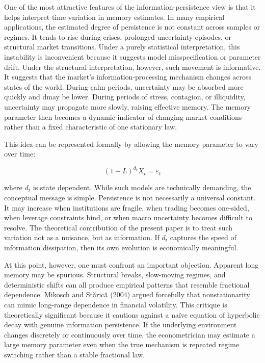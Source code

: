 \documentclass[12pt]{article}
\begin{document}
One of the most attractive features of the information-persistence view is that it helps interpret time variation in memory estimates. In many empirical applications, the estimated degree of persistence is not constant across samples or regimes. It tends to rise during crises, prolonged uncertainty episodes, or structural market transitions. Under a purely statistical interpretation, this instability is inconvenient because it suggests model misspecification or parameter drift. Under the structural interpretation, however, such movement is informative. It suggests that the market's information-processing mechanism changes across states of the world. During calm periods, uncertainty may be absorbed more quickly and dmay be lower. During periods of stress, contagion, or illiquidity, uncertainty may propagate more slowly, raising effective memory. The memory parameter then becomes a dynamic indicator of changing market conditions rather than a fixed characteristic of one stationary law.

This idea can be represented formally by allowing the memory parameter to vary over time:

\[(1-L)^{d_t} X_t = \varepsilon_t\]

where $d_t$ is state dependent. While such models are technically demanding, the conceptual message is simple. Persistence is not necessarily a universal constant. It may increase when institutions are fragile, when trading becomes one-sided, when leverage constraints bind, or when macro uncertainty becomes difficult to resolve. The theoretical contribution of the present paper is to treat such variation not as a nuisance, but as information. If $d_t$ captures the speed of information dissipation, then its own evolution is economically meaningful.

At this point, however, one must confront an important objection. Apparent long memory may be spurious. Structural breaks, slow-moving regimes, and deterministic shifts can all produce empirical patterns that resemble fractional dependence. Mikosch and St\u{a}ric\u{a} (2004) argued forcefully that nonstationarity can mimic long-range dependence in financial volatility. This critique is theoretically significant because it cautions against a na\"{i}ve equation of hyperbolic decay with genuine information persistence. If the underlying environment changes discretely or continuously over time, the econometrician may estimate a large memory parameter even when the true mechanism is repeated regime switching rather than a stable fractional law.
\end{document}
